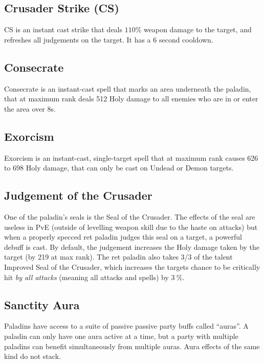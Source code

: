\documentclass[letterpaper,11pt]{article}
\begin{document}
	\subsection{Crusader Strike (CS)}
	CS is an instant cast strike that deals $110 \%$ weapon damage to the target, and refreshes all judgements on the target.
	It has a 6 second cooldown.
	
	
	\subsection{Consecrate}
	Consecrate is an instant-cast spell that marks an area underneath the paladin, that at maximum rank deals 512 Holy damage to all enemies who are in or enter the area over 8s.

	
	\subsection{Exorcism}
	Exorcism is an instant-cast, single-target spell that at maximum rank causes 626 to 698 Holy damage, that can only be cast on Undead or Demon targets.
	
	
	\subsection{Judgement of the Crusader}
	One of the paladin's seals is the Seal of the Crusader.
	The effects of the seal are useless in PvE (outside of levelling weapon skill due to the haste on attacks) but when a properly specced ret paladin judges this seal on a target, a powerful debuff is cast.
	By default, the judgement increases the Holy damage taken by the target (by 219 at max rank).
	The ret paladin also takes 3/3 of the talent Improved Seal of the Crusader, which increases the targets chance to be critically hit \emph{by all attacks} (meaning all attacks and spells) by $3~\%$.	
	
	\subsection{Sanctity Aura}
	Paladins have access to a suite of passive passive party buffs called ``auras''.
	A paladin can only have one aura active at a time, but a party with multiple paladins can benefit simultaneously from multiple auras.
	Aura effects of the same kind do not stack.
	
\end{document}
